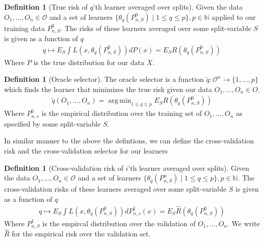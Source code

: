 \documentclass[11pt, a4paper]{article}
\DeclareMathOperator*{\argmin}{arg\,min}
\theoremstyle{definition}
\newtheorem{definition}[theorem]{Definition}
\theoremstyle{remark}
\newcommand{\cl}{q}
\begin{document}
\begin{definition}[True risk of $ \cl $'th learner averaged over splits]
    Given the data $ O_1, \ldots, O_n \in \mathcal{O} $ and a set of learners $ \{ \theta_{\cl}(P_{n, S}^{0}) \mid 1 \leq \cl \leq p \}, p \in \mathbb{N} $ applied to our training data $ P_{n, S}^{0} $. The risks of these learners averaged over some split-variable $ S $ is given as a function of $ \cl $ 
    \begin{align*}
        \cl \mapsto E_S \int L(x, \theta_{\cl}(P_{n,S}^{0}) ) dP(x) = E_S R( \theta_\cl(P_{n,S}^{0})) 
    \end{align*}
    Where $ P $ is the true distribution for our data $ X $.
\end{definition}

\begin{definition}[Oracle selector]
    The oracle selector is a function $ \tilde{\cl}: \mathcal{O}^{n} \to \{1,\ldots,p\} $  which finds the learner that minimizes the true risk given our data $ O_1 , \ldots , O_n \in O$. 
    \begin{align*}
        \tilde{\cl}(O_1 , \ldots, O_n) = \argmin_{1 \leq \cl \leq p} E_S R( \theta _\cl (P_{n,S}^0 )) 
    \end{align*}
    Where $ P_{n ,s}^{0} $ is the empirical distribution over the training set of $O_1 , \ldots, O_n $ as specified by some split-variable $ S $. 
\end{definition}
In similar manner to the above the defintions, we can define the cross-validation risk and the cross-validation selector for our learners 

\begin{definition}[Cross-validation risk of $ i $'th learner averaged over splits]
    Given the data $ O_1, \ldots, O_n \in \mathcal{O} $ and a set of learners $ \{ \theta_{\cl}(P_{n, S}^{n}) \mid 1 \leq \cl \leq p \}, p \in \mathbb{N} $. The cross-validation risks of these learners averaged over some split-variable $ S $ is given as a function of $ \cl $ 
    \begin{align*}
        \cl \mapsto E_S \int L(x, \theta_{\cl}(P_{n,S}^{0}) ) dP_{n, s}^{1}(x) = E_S \hat{R}( \theta_\cl(P_{n,S}^{0})) 
    \end{align*}
    Where $ P_{n,S}^{1} $ is the empircal distribution over the validation of $ O_1 , \dots, O_n $. We write $ \hat{R} $ for the empirical risk over the validation set. 
\end{definition}
\end{document}
